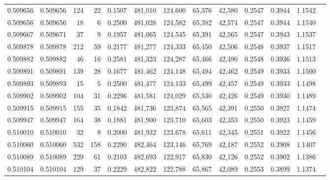 \begin{tabular}{rrrrrrrrrrrrr}
0.509656 & 0.509656 &   124 &    22 &                                     0.1507 & 481,010 & 124,600 &  65,376 &  42,580 & 0.2547 & 0.3944 & 1.1542 \\
0.509656 & 0.509656 &    18 &     6 &                                     0.2500 & 481,028 & 124,582 &  65,382 &  42,574 & 0.2547 & 0.3944 & 1.1540 \\
0.509667 & 0.509671 &    37 &     9 &                                     0.1957 & 481,065 & 124,545 &  65,391 &  42,565 & 0.2547 & 0.3943 & 1.1537 \\
0.509878 & 0.509878 &   212 &    59 &                                     0.2177 & 481,277 & 124,333 &  65,450 &  42,506 & 0.2548 & 0.3937 & 1.1517 \\
0.509882 & 0.509882 &    46 &    16 &                                     0.2581 & 481,323 & 124,287 &  65,466 &  42,490 & 0.2548 & 0.3936 & 1.1513 \\
0.509891 & 0.509891 &   139 &    28 &                                     0.1677 & 481,462 & 124,148 &  65,494 &  42,462 & 0.2549 & 0.3933 & 1.1500 \\
0.509893 & 0.509893 &    15 &     5 &                                     0.2500 & 481,477 & 124,133 &  65,499 &  42,457 & 0.2549 & 0.3933 & 1.1498 \\
0.509902 & 0.509902 &   104 &    31 &                                     0.2296 & 481,581 & 124,029 &  65,530 &  42,426 & 0.2549 & 0.3930 & 1.1489 \\
0.509915 & 0.509915 &   155 &    35 &                                     0.1842 & 481,736 & 123,874 &  65,565 &  42,391 & 0.2550 & 0.3927 & 1.1474 \\
0.509947 & 0.509947 &   164 &    38 &                                     0.1881 & 481,900 & 123,710 &  65,603 &  42,353 & 0.2550 & 0.3923 & 1.1459 \\
0.510010 & 0.510010 &    32 &     8 &                                     0.2000 & 481,932 & 123,678 &  65,611 &  42,345 & 0.2551 & 0.3922 & 1.1456 \\
0.510060 & 0.510060 &   532 &   158 &                                     0.2290 & 482,464 & 123,146 &  65,769 &  42,187 & 0.2552 & 0.3908 & 1.1407 \\
0.510089 & 0.510089 &   229 &    61 &                                     0.2103 & 482,693 & 122,917 &  65,830 &  42,126 & 0.2552 & 0.3902 & 1.1386 \\
0.510104 & 0.510104 &   129 &    37 &                                     0.2229 & 482,822 & 122,788 &  65,867 &  42,089 & 0.2553 & 0.3899 & 1.1374 \\

\end{tabular}
